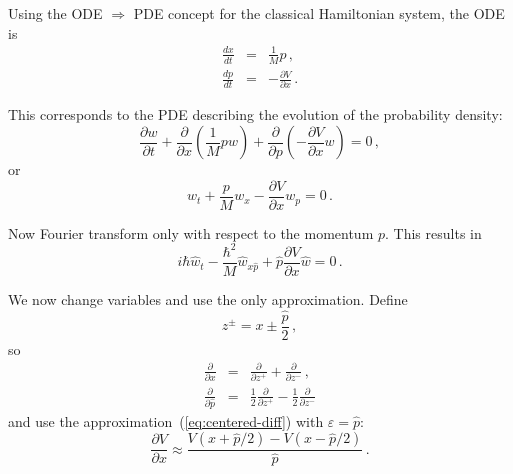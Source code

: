 \documentclass[prb,preprint]{revtex4-1}
\begin{document}
Using the ODE $\Rightarrow$ PDE concept for the classical Hamiltonian system, the ODE is
\begin{eqnarray}
\frac{dx}{dt} &=& \frac{1}{M}p \,, \\
\frac{dp}{dt} &=& -\frac{\partial V}{\partial x} \,.
\end{eqnarray}

This corresponds to the PDE describing the evolution of the probability density:
\begin{equation}
\frac{\partial w}{\partial t}
+ \frac{\partial}{\partial x}\left(\frac{1}{M}pw\right)
+ \frac{\partial}{\partial p}\left(-\frac{\partial V}{\partial x}w\right)
= 0 \,,
\end{equation}
or
\begin{equation}\label{eq:liouville-hamiltonian}
w_t + \frac{p}{M} w_x - \frac{\partial V}{\partial x} w_p = 0 \,.
\end{equation}

Now Fourier transform only with respect to the momentum $p$.  This results in
\begin{equation}\label{eq:fourier-liouville}
i\hbar \hat{w}_t - \frac{\hbar^2}{M} \hat{w}_{x\hat{p}} + \hat{p} \frac{\partial V}{\partial x} \hat{w} = 0 \,.
\end{equation}

We now change variables and use the only approximation.  Define
\begin{equation}
z^{\pm} = x \pm \frac{\hat{p}}{2} \,,
\end{equation}
so
\begin{eqnarray}
\frac{\partial}{\partial x} & = & \frac{\partial}{\partial z^+} + \frac{\partial}{\partial z^-}\,,\\
\frac{\partial}{\partial \hat{p}} &=& \frac{1}{2}\frac{\partial}{\partial z^+}
- \frac{1}{2}\frac{\partial}{\partial z^-}
\end{eqnarray}
and use the approximation~(\ref{eq:centered-diff}) with $\varepsilon = \hat{p}$:
\begin{equation}\label{eq:approx-V}
\frac{\partial V}{\partial x}
\approx \frac{V(x+\hat{p}/2) - V(x-\hat{p}/2)}{\hat{p}} \,.
\end{equation}
\end{document}
